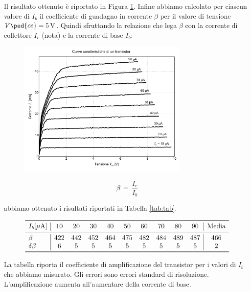 Il risultato ottenuto è riportato in Figura \ref{fig:cara}.
Infine abbiamo calcolato per ciascun valore di $I_b$ il coefficiente di guadagno in corrente $\beta$ per il valore di tensione $V\ped{ce}=\SI{5}{\volt}$. Quindi sfruttando la relazione che lega $\beta$ con la corrente di collettore $I_c$ (nota) e la corrente di base $I_b$:

\begin{figure}
	\centering
	\includegraphics[width=0.75\textwidth]{transistor.pdf}
	\caption{}
	\label{fig:cara}
\end{figure}

\begin{equation}
	\beta \,=\, \frac{I_c}{I_b}
\end{equation}

abbiamo ottenuto i risultati riportati in Tabella \ref{tab:tab}.

\begin{table}[h]
    \centering
    \[
    \begin{array}{l | c c c c c c c c c | c}
        \toprule
        I_b [\mu\text{A}] & 10 & 20 & 30 & 40 & 50 & 60 & 70 & 80 & 90 & \text{Media} \\
        \midrule 
        \beta & 422 & 442 & 452 & 464 & 475 & 482 & 484 & 489 & 487 & 466 \\
        \delta\beta & 6 & 5 & 5 & 5 & 5 & 5 & 5 & 5 & 5 & 2 \\
        \bottomrule
    \end{array}\]
    \caption{La tabella riporta il coefficiente di amplificazione del transistor per i valori di $I_b$ che abbiamo
        misurato. Gli errori sono errori standard di risoluzione. L'amplificazione aumenta
        all'aumentare della corrente di base.}
    \label{tab:tab}
\end{table}
